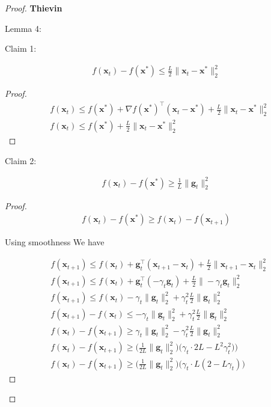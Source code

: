 \documentclass{article}
\begin{document}
\begin{proof}
	\textbf{Thievin}

	Lemma 4:
	
	Claim 1:
	
	\begin{align}
		f(\mathbf{x}_t) - f(\mathbf{x}^*) \le \frac{L}{2}\|\mathbf{x}_t-\mathbf{x}^*\|^2_2
	\end{align}
	
	\begin{proof}
		\begin{align}
			&f(\mathbf{x}_t) \le f(\mathbf{x}^*)  + \nabla f(\mathbf{x}^*)^\top(\mathbf{x}_t - \mathbf{x}^*) + \frac{L}{2}\|\mathbf{x}_t - \mathbf{x}^* \|^2_2\\
			&f(\mathbf{x}_t) \le f(\mathbf{x}^*)  + \frac{L}{2}\|\mathbf{x}_t - \mathbf{x}^* \|^2_2
		\end{align}
	\end{proof}
	
	Claim 2:
	
	\begin{align}
		f(\mathbf{x}_t) - f(\mathbf{x}^*) \ge \frac{1}{L}\|\mathbf{g}_t\|^2_2
	\end{align}
	
	\begin{proof}
		\begin{align}
			f(\mathbf{x}_t) - f(\mathbf{x}^*) \ge f(\mathbf{x}_t) - f(\mathbf{x}_{t+1})
		\end{align}
		
		Using smoothness We have
		
		\begin{align}
			&f(\mathbf{x}_{t+1}) \le f(\mathbf{x}_t) + \mathbf{g}_t^\top(\mathbf{x}_{t+1} - \mathbf{x}_t) + \frac{L}{2}\|\mathbf{x}_{t+1} - \mathbf{x}_t \|^2_2\\
			&f(\mathbf{x}_{t+1}) \le f(\mathbf{x}_t) + \mathbf{g}_t^\top(-\gamma_t\mathbf{g}_t) + \frac{L}{2}\|-\gamma_t\mathbf{g}_t \|^2_2\\
			&f(\mathbf{x}_{t+1}) \le f(\mathbf{x}_t) -\gamma_t\|\mathbf{g}_t\|^2_2 + \gamma_t^2 \frac{L}{2}\|\mathbf{g}_t \|^2_2\\
			&f(\mathbf{x}_{t+1}) - f(\mathbf{x}_t) \le  -\gamma_t\|\mathbf{g}_t\|^2_2 + \gamma_t^2 \frac{L}{2}\|\mathbf{g}_t \|^2_2\\
			& f(\mathbf{x}_t) - f(\mathbf{x}_{t+1}) \ge  \gamma_t\|\mathbf{g}_t\|^2_2 - \gamma_t^2 \frac{L}{2}\|\mathbf{g}_t \|^2_2\\
			& f(\mathbf{x}_t) - f(\mathbf{x}_{t+1}) \ge  \bigg( \frac{1}{2L} \|\mathbf{g}_t \|^2_2 \bigg) \big(\gamma_t\cdot 2L - L^2\gamma_t^2) \big)\\
			& f(\mathbf{x}_t) - f(\mathbf{x}_{t+1}) \ge  \bigg( \frac{1}{2L} \|\mathbf{g}_t \|^2_2 \bigg) \big(\gamma_t\cdot L(2 - L\gamma_t)  \big)
		\end{align}
		

\end{proof}
\end{proof}
\end{document}
